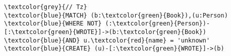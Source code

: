 \begin{Verbatim}[commandchars=\\\{\},fontsize=\small,xleftmargin=.2in]
\textcolor{grey}{// Tz}
\textcolor{blue}{MATCH} (b:\textcolor{green}{Book}),(u:Person)
\textcolor{blue}{WHERE NOT} (:\textcolor{green}{Person})-[:\textcolor{green}{WROTE}]->(b:\textcolor{green}{Book})
\textcolor{blue}{AND} u.\textcolor{red}{name} = 'unknown'
\textcolor{blue}{CREATE} (u)-[:\textcolor{green}{WROTE}]->(b)
\end{Verbatim}